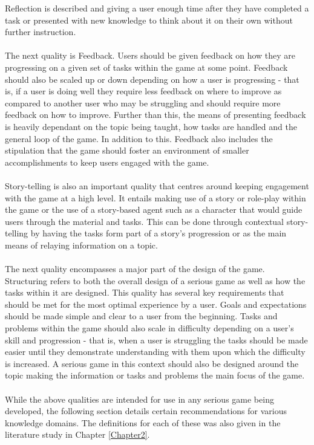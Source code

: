 \noindent Reflection is described and giving a user enough time after they have completed a task or presented with new knowledge to think about it on their own without further instruction.
\\\\
The next quality is Feedback. Users should be given feedback on how they are progressing on a given set of tasks within the game at some point. Feedback should also be scaled up or down depending on how a user is progressing - that is, if a user is doing well they require less feedback on where to improve as compared to another user who may be struggling and should require more feedback on how to improve. Further than this, the means of presenting feedback is heavily dependant on the topic being taught, how tasks are handled and the general loop of the game. In addition to this. Feedback also includes the stipulation that the game should foster an environment of smaller accomplishments to keep users engaged with the game.
\\\\
Story-telling is also an important quality that centres around keeping engagement with the game at a high level. It entails making use of a story or role-play within the game or the use of a story-based agent such as a character that would guide users through the material and tasks. This can be done through contextual story-telling by having the tasks form part of a story's progression or as the main means of relaying information on a topic.
\\\\
The next quality encompasses a major part of the design of the game. Structuring refers to both the overall design of a serious game as well as how the tasks within it are designed. This quality has several key requirements that should be met for the most optimal experience by a user. Goals and expectations should be made simple and clear to a user from the beginning. Tasks and problems within the game should also scale in difficulty depending on a user's skill and progression - that is, when a user is struggling the tasks should be made easier until they demonstrate understanding with them upon which the difficulty is increased. A serious game in this context should also be designed around the topic making the information or tasks and problems the main focus of the game.
\\\\
While the above qualities are intended for use in any serious game being developed, the following section details certain recommendations for various knowledge domains. The definitions for each of these was also given in the literature study in Chapter \ref{Chapter2}.
